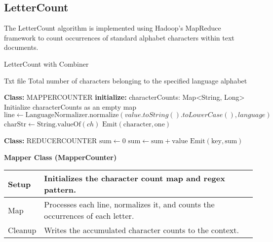     

\subsection{LetterCount}
The LetterCount algorithm is implemented using Hadoop's MapReduce framework to count occurrences of standard alphabet characters within text documents.

\begin{algorithm}
    \caption{LetterCount with Combiner}
    \begin{algorithmic}[1]
    \Require Txt file
    \Ensure Total number of characters belonging to the specified language alphabet
    \\
    \Statex
    
    \textbf{Class:} MAPPERCOUNTER
    \State \textbf{initialize:}
    \State  characterCounts: Map<String, Long> \\
    
        \State Initialize characterCounts as an empty map
    \EndProcedure\\
    
        \State $\text{line} \gets \text{LanguageNormalizer.normalize}(value.toString().toLowerCase(), language)$
                \State $\text{charStr} \gets \text{String.valueOf}(ch)$
                \State $\text{Emit}(\text{character}, \text{one})$
        \EndFor
    \EndProcedure\\
        
    \Statex
    
    \textbf{Class:} REDUCERCOUNTER
        \State $\text{sum} \gets 0$
            \State $\text{sum} \gets \text{sum} + \text{value}$
        \EndFor
        \State $\text{Emit}(\text{key}, \text{sum})$
    \EndProcedure
    \end{algorithmic}
    \end{algorithm}

\textbf{Mapper Class (MapperCounter)}
\begin{longtable}{|>{\raggedright\arraybackslash}p{}|>{\raggedright\arraybackslash}p{}|}
    \hline
    Setup &  Initializes the character count map and regex pattern.\\
    \hline
    Map &  Processes each line, normalizes it, and counts the occurrences of each letter.\\
    \hline
    Cleanup &Writes the accumulated character counts to the context.\\
    \hline
\end{longtable}



